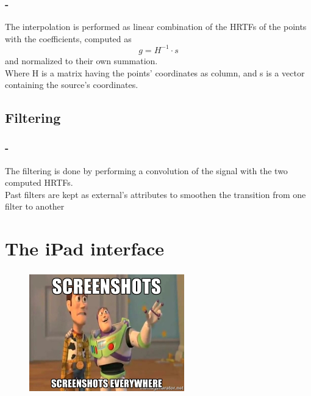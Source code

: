 \documentclass{beamer}
\begin{document}
	\begin{frame}
		\frametitle{\insertsection - \insertsubsection}
		The interpolation is performed as linear combination of the HRTFs of the points with the coefficients, computed as
		\begin{equation} g = H^{-1} \cdot s \end{equation}
		and normalized to their own summation.\\
		Where H is a matrix having the points' coordinates as column, and s is a vector containing the source's
		coordinates.\\
	\end{frame}
	
	\subsection{Filtering}

	\begin{frame}
		\frametitle{\insertsection - \insertsubsection}
		The filtering is done by performing a convolution of the signal with the two computed HRTFs.\\
		Past filters are kept as external's attributes to smoothen the transition from one filter to another\\
	\end{frame}

	\section{The iPad interface}

	\begin{frame}
		\frametitle{\insertsection}
		\begin{figure}
			\centering
			  \includegraphics[width=0.6\textwidth]{images/marine.jpg}
		\end{figure}
	\end{frame}

	\begin{frame}
		\frametitle{\insertsection}
	\end{frame}

	\begin{frame}
		\frametitle{\insertsection}
	\end{frame}
\end{document}
